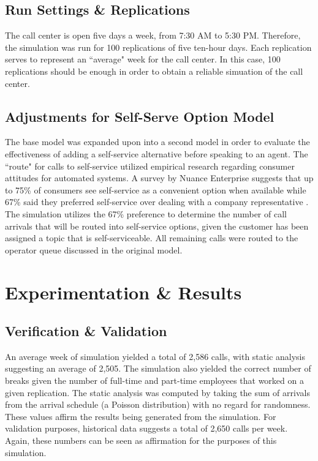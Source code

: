\documentclass[12pt,twocolumn]{article}
\begin{document}
	\subsection{Run Settings \& Replications}
	
	 The call center is open five days a week, from 7:30 AM to 5:30 PM.  Therefore, the simulation was run for 100 replications of five ten-hour days.  Each replication serves to represent an ``average" week for the call center.  In this case, 100 replications should be enough in order to obtain a reliable simuation of the call center.
	 
	 
	\subsection{Adjustments for Self-Serve Option Model}
	
	The base model was expanded upon into a second model in order to evaluate the effectiveness of adding a self-service alternative before speaking to an agent.  The ``route" for calls to self-service utilized empirical research regarding consumer attitudes for automated systems.  A survey by Nuance Enterprise suggests that up to 75\% of consumers see self-service as a convenient option when available while 67\% said they preferred self-service over dealing with a company representative \cite{webblog}.  The simulation utilizes the 67\% preference to determine the number of call arrivals that will be routed into self-service options, given the customer has been assigned a topic that is self-serviceable.  All remaining calls were routed to the operator queue discussed in the original model.

\section{Experimentation \& Results}

	\subsection{Verification \& Validation}
	
	  An average week of simulation yielded a total of 2,586 calls, with static analysis suggesting an average of 2,505.  The simulation also yielded the correct number of breaks given the number of full-time and part-time employees that worked on a given replication.  The static analysis was computed by taking the sum of arrivals from the arrival schedule (a Poisson distribution) with no regard for randomness.  These values affirm the results being generated from the simulation.  For validation purposes, historical data suggests a total of 2,650 calls per week.  Again, these numbers can be seen as affirmation for the purposes of this simulation.
	  
\end{document}
